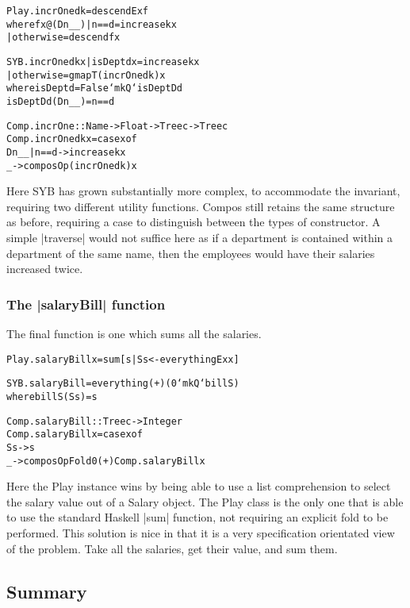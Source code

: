 \documentclass[preprint]{sigplanconf}
\newenvironment{code}{\begin{alltt}\small}{\end{alltt}}
\begin{document}
\begin{code}
Play.incrOne d k = descendEx f
    where f x@(D n _ _)  | n == d     = increase k x
                         | otherwise  = descend f x

SYB.incrOne d k x  | isDept d x  = increase k x
                   | otherwise   = gmapT (incrOne d k) x
    where  isDept   d = False `mkQ` isDeptD d
           isDeptD  d (D n _ _) = n == d

Comp.incrOne :: Name -> Float -> Tree c -> Tree c
Comp.incrOne d k x = case x of
    D n _ _ | n == d -> increase k x
    _ -> composOp (incrOne d k) x
\end{code}

Here SYB has grown substantially more complex, to accommodate the invariant, requiring two different utility functions. Compos still retains the same structure as before, requiring a case to distinguish between the types of constructor. A simple |traverse| would not suffice here as if a department is contained within a department of the same name, then the employees would have their salaries increased twice.

\subsubsection{The |salaryBill| function}

The final function is one which sums all the salaries.

\begin{code}
Play.salaryBill x = sum [s | S s <- everythingEx x]

SYB.salaryBill = everything (+) (0 `mkQ` billS)
   where billS (S s) = s

Comp.salaryBill :: Tree c -> Integer
Comp.salaryBill x = case x of
    S s -> s
    _ -> composOpFold 0 (+) Comp.salaryBill x
\end{code}

Here the Play instance wins by being able to use a list comprehension to select the salary value out of a Salary object. The Play class is the only one that is able to use the standard Haskell |sum| function, not requiring an explicit fold to be performed. This solution is nice in that it is a very specification orientated view of the problem. Take all the salaries, get their value, and sum them.

\subsection{Summary}
\end{document}
